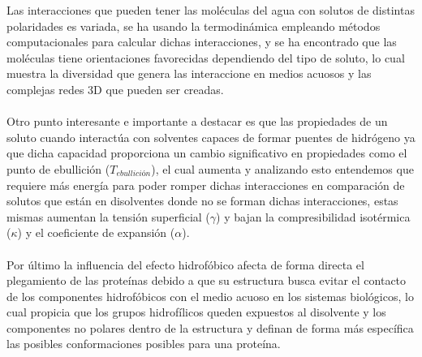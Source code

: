 \documentclass[10pt]{article}
\newcommand{\np}[1]{\paragraph{\normalfont{#1}}}
\begin{document}
    Las interacciones que pueden tener las moléculas del agua con solutos de distintas polaridades es variada, se ha usando la termodinámica empleando métodos computacionales para calcular dichas interacciones, y se ha encontrado que las moléculas tiene orientaciones favorecidas dependiendo del tipo de soluto, lo cual muestra la diversidad que genera las interaccione en medios acuosos y las complejas redes 3D que pueden ser creadas.\np{}
   
    Otro punto interesante e importante a destacar es que las propiedades de un soluto cuando interactúa con solventes capaces de formar puentes de hidrógeno ya que dicha capacidad proporciona un cambio significativo en propiedades como el punto de ebullición ($T_{ebullición}$), el cual aumenta y analizando esto entendemos que requiere más energía para poder romper dichas interacciones en comparación de solutos que están en disolventes donde no se forman dichas interacciones, estas mismas aumentan la tensión superficial ($\gamma$) y bajan la  compresibilidad isotérmica ($\kappa$) y el coeficiente de expansión ($\alpha$).  \np{}
    
    Por último la influencia del efecto hidrofóbico afecta de forma directa el plegamiento de las proteínas debido a que su estructura busca evitar el contacto de los componentes hidrofóbicos con el medio acuoso en los sistemas biológicos, lo cual propicia que los grupos hidrofílicos queden expuestos al disolvente y los componentes no polares dentro de la estructura y definan de forma más específica las posibles conformaciones posibles para una proteína.
    

    \paragraph{}

    
    

\end{document}
